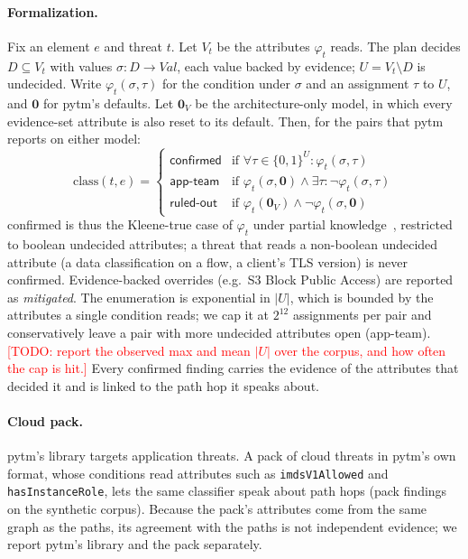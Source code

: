 \documentclass[sigconf,review,anonymous]{acmart}
\newcommand{\todo}[1]{\textcolor{red}{[TODO: #1]}}
\newcommand{\conf}{\textsf{confirmed}\xspace}
\newcommand{\ask}{\textsf{app-team}\xspace}
\newcommand{\ruled}{\textsf{ruled-out}\xspace}
\begin{document}
\paragraph{Formalization.} Fix an element $e$ and threat $t$. Let $V_t$ be the attributes $\varphi_t$ reads. The plan
decides $D \subseteq V_t$ with values $\sigma: D \to \mathit{Val}$, each value backed by evidence; $U = V_t \setminus D$ is
undecided. Write $\varphi_t(\sigma, \tau)$ for the condition under $\sigma$ and an assignment $\tau$ to $U$, and $\mathbf{0}$
for pytm's defaults. Let $\mathbf{0}_V$ be the architecture-only model, in which every evidence-set attribute is also reset to
its default. Then, for the pairs that pytm reports on either model:
\[
\mathrm{class}(t,e) =
\begin{cases}
\conf & \text{if } \forall \tau \in \{0,1\}^U: \varphi_t(\sigma,\tau) \\
\ask & \text{if } \varphi_t(\sigma,\mathbf{0}) \wedge \exists \tau: \neg\varphi_t(\sigma,\tau)\\
\ruled & \text{if } \varphi_t(\mathbf{0}_V) \wedge \neg\varphi_t(\sigma,\mathbf{0})
\end{cases}
\]
\conf is thus the Kleene-true case of $\varphi_t$ under partial knowledge~\cite{kleene1952}, restricted to boolean
undecided attributes; a threat that reads a non-boolean undecided attribute (a data classification on a flow, a client's TLS
version) is never \conf. Evidence-backed overrides (e.g.\ S3 Block Public Access) are reported as \emph{mitigated}. The
enumeration is exponential in $|U|$, which is bounded by the attributes a single condition reads; we cap it at $2^{12}$
assignments per pair and conservatively leave a pair with more undecided attributes open (\ask).
\todo{report the observed max and mean $|U|$ over the corpus, and how often the cap is hit.} Every \conf finding carries the evidence of the
attributes that decided it and is linked to the path hop it speaks about.

\paragraph{Cloud pack.} pytm's library targets application threats. A pack of \NumPackThreats cloud threats in pytm's own
format, whose conditions read attributes such as \texttt{imdsV1Allowed} and \texttt{hasInstanceRole}, lets the same
classifier speak about path hops (\NumTOnePackFindings pack findings on the synthetic corpus). Because the pack's attributes come from the same graph as the paths, its
agreement with the paths is not independent evidence; we report pytm's library and the pack separately.
\end{document}
